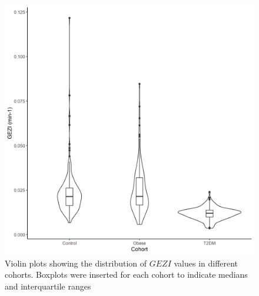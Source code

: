 \documentclass[utf8]{frontiersSCNS} %
\begin{document}
\begin{figure}[h!]
\begin{center}
\includegraphics[width=15cm]{SG_co.PNG}
\end{center}
\caption{Violin plots showing the distribution of $GEZI$ values in different cohorts. Boxplots were inserted for each cohort to indicate medians and interquartile ranges}
\label{fig: SG_co}
\end{figure}
\end{document}
